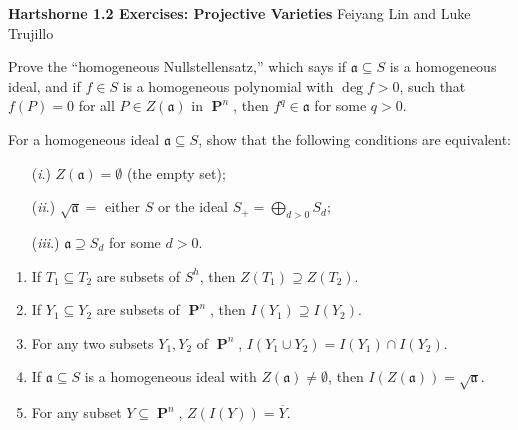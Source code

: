 \documentclass{hw_pset} %
\DeclareMathOperator{\pp}{\mathbf{P}} %
\newcommand{\header}[2]{
    {\noindent
    {\Large \bf Hartshorne #1 Exercises: #2}
    \hfill 
    {\large Feiyang Lin and Luke Trujillo}
    \vspace{0.5cm}}
}
\begin{document}
\header{1.2}{Projective Varieties}

\begin{exercise}[Exercise 2.1]
    Prove the ``homogeneous Nullstellensatz,'' which says if $\mathfrak{a}
    \subseteq S$ is a homogeneous ideal, and if $f \in S$ is a homogeneous
    polynomial with $\deg f > 0$, such that $f(P) = 0$ for all $P \in
    Z(\mathfrak{a})$ in $\pp^n$, then $f^q \in \mathfrak{a}$ for some $q >
    0$.
\end{exercise}

\begin{solution}

\end{solution}

\begin{exercise}[Exercise 2.2]
    For a homogeneous ideal $\mathfrak{a} \subseteq S$, show that the following
    conditions are equivalent:
    \begin{itemize}
        \item[(\emph{i}.)] $Z(\mathfrak{a}) = \emptyset$ (the empty set);
        \item[(\emph{ii}.)] $\sqrt{\mathfrak{a}} =$ either $S$ or the ideal $S_+ =
        \bigoplus_{d > 0}S_d$;
        \item[(\emph{iii}.)] $\mathfrak{a} \supseteq S_d$ for some $d > 0$. 
    \end{itemize}
\end{exercise}

\begin{solution}
    
\end{solution}

\begin{exercise}[Exercise 2.3]
    \begin{enumerate}
        \item If $T_1 \subseteq T_2$ are subsets of $S^h$, then $Z(T_1) \supseteq
        Z(T_2)$.
      \item If $Y_1 \subseteq Y_2$ are subsets of $\pp^n$, then $I(Y_1) \supseteq
        I(Y_2)$.
      \item For any two subsets $Y_1,Y_2$ of $\pp^n$, $I(Y_1 \cup Y_2) = I(Y_1)
        \cap I(Y_2)$.
      \item If $\mathfrak{a} \subseteq S$ is a homogeneous ideal with
        $Z(\mathfrak{a}) \ne \emptyset$, then $I(Z(\mathfrak{a})) =
        \sqrt{\mathfrak{a}}$.
      \item For any subset $Y \subseteq \pp^n$, $Z(I(Y)) = \overline{Y}$.
    \end{enumerate}
\end{exercise}
\end{document}
